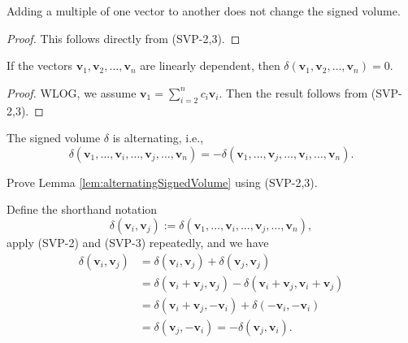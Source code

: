 \begin{lem}
  Adding a multiple of one vector to another does not
  change the signed volume.
\end{lem}
\begin{proof}
  This follows directly from (SVP-2,3).
\end{proof}

\begin{lem}
  If the vectors $\mathbf{v}_1, \mathbf{v}_{2},\ldots,
  \mathbf{v}_{n}$ are linearly dependent,
  then $\delta(\mathbf{v}_1, \mathbf{v}_{2}, \ldots, \mathbf{v}_{n})=0$.
\end{lem}
\begin{proof}
  WLOG, we assume $\mathbf{v}_1=\sum_{i=2}^n c_i \mathbf{v}_i$.
  Then the result follows from (SVP-2,3).
\end{proof}

\begin{lem}
  \label{lem:alternatingSignedVolume}
  The signed volume $\delta$ is alternating, i.e.,
  \begin{equation}
    \label{eq:alternatingSignedVolume}
    \delta(\mathbf{v}_1, \ldots,
    \mathbf{v}_{i},\ldots, \mathbf{v}_{j},
    \ldots, \mathbf{v}_n)
    = - 
    \delta(\mathbf{v}_1, \ldots,
    \mathbf{v}_{j},\ldots, \mathbf{v}_{i},
    \ldots, \mathbf{v}_n).
  \end{equation}
\end{lem}

\begin{exc}
  Prove Lemma \ref{lem:alternatingSignedVolume} using (SVP-2,3).
\end{exc}
\begin{solution}
  Define the shorthand notation
  \begin{displaymath}
    \delta(\mathbf{v}_i, \mathbf{v}_j)
    := \delta(\mathbf{v}_1, \ldots,
    \mathbf{v}_{i},\ldots, \mathbf{v}_{j},
    \ldots, \mathbf{v}_n), 
  \end{displaymath}
  apply (SVP-2) and (SVP-3) repeatedly, and we have 
  \begin{align*}
    \delta(\mathbf{v}_i, \mathbf{v}_j)
    &= \delta(\mathbf{v}_i, \mathbf{v}_j)
      + \delta(\mathbf{v}_j, \mathbf{v}_j)
    \\
    &= \delta(\mathbf{v}_i+\mathbf{v}_j, \mathbf{v}_j)
      - \delta(\mathbf{v}_i+\mathbf{v}_j, \mathbf{v}_i+\mathbf{v}_j)
    \\
    &= \delta(\mathbf{v}_i+\mathbf{v}_j, -\mathbf{v}_i)
      + \delta(-\mathbf{v}_i, -\mathbf{v}_i)
    \\
    &= \delta(\mathbf{v}_j, -\mathbf{v}_i)
      = -\delta(\mathbf{v}_j, \mathbf{v}_i).
  \end{align*}
\end{solution}


